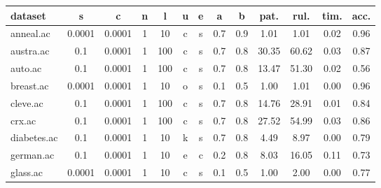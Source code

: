 \begin{table}[htbp]
	\centering
		\renewcommand{\tabcolsep}{1.8mm}
		\resizebox{0.95\textwidth}{!} {
		\begin{tabular}{|l|c|c|c|c|c|c|c|c||c|c|c|c|}
		\hline
		\textbf{dataset}	& \textbf{s}	& \textbf{c}	& \textbf{n}	& \textbf{l}	& \textbf{u}	& \textbf{e} & \textbf{a} & \textbf{b} & \textbf{pat.}	& \textbf{rul.}	& \textbf{tim.}	& \textbf{acc.}	\\
		\hline
		anneal.ac      & 0.0001   & 0.0001      & 1              & 10       & c                   & s        & 0.7    & 0.9   & 1.01           & 1.01           & 0.02           & 0.96           \\
		\hline
		austra.ac      & 0.1      & 0.0001      & 1              & 100      & c                   & s        & 0.7    & 0.8   & 30.35          & 60.62          & 0.03           & 0.87           \\
		\hline
		auto.ac        & 0.1      & 0.0001      & 1              & 100      & c                   & s        & 0.7    & 0.8   & 13.47          & 51.30          & 0.02           & 0.56           \\
		\hline
		breast.ac      & 0.0001   & 0.0001      & 1              & 10       & o                   & s        & 0.1    & 0.5   & 1.00           & 1.01           & 0.00           & 0.96           \\
		\hline
		cleve.ac       & 0.1      & 0.0001      & 1              & 100      & c                   & s        & 0.7    & 0.8   & 14.76          & 28.91          & 0.01           & 0.84           \\
		\hline
		crx.ac         & 0.1      & 0.0001      & 1              & 100      & c                   & s        & 0.7    & 0.8   & 27.52          & 54.99          & 0.03           & 0.86           \\
		\hline
		diabetes.ac    & 0.1      & 0.0001      & 1              & 10       & k                   & s        & 0.7    & 0.8   & 4.49           & 8.97           & 0.00           & 0.79           \\
		\hline
		german.ac      & 0.1      & 0.0001      & 1              & 10       & e                   & c        & 0.2    & 0.8   & 8.03           & 16.05          & 0.11           & 0.73           \\
		\hline
		glass.ac       & 0.0001   & 0.0001      & 1              & 10       & c                   & s        & 0.1    & 0.5   & 1.00           & 2.00           & 0.00           & 0.77           \\

\end{tabular}}
\end{table}

